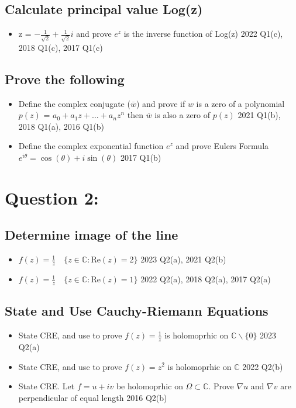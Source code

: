\documentclass[a4paper, 8pt]{extarticle}
\begin{document}
\subsection{Calculate principal value Log(z)}
\begin{itemize}
    \item z = $-\frac{1}{\sqrt{2}} + \frac{1}{\sqrt{2}} i$ and prove $e^z$ is the inverse function of Log(z) \hfill 2022 Q1(c), 2018 Q1(c), 2017 Q1(c)
\end{itemize}
\subsection{Prove the following}
\begin{itemize}
    \item Define the complex conjugate ($\overline{w}$) and prove if $w$ is a zero of a polynomial $p(z)$ = $a_0 + a_1 z + \ldots + a_n z^n$ then $\overline{w}$ is also a zero of $p(z)$ \hfill 2021 Q1(b), 2018 Q1(a), 2016 Q1(b)
    \item Define the complex exponential function $e^z$ and prove Eulers Formula $e^{i \theta} = \cos(\theta) + i \sin(\theta)$ \hfill 2017 Q1(b)
\end{itemize}





\pagebreak


\section{Question 2: }
\subsection{Determine image of the line}
\begin{itemize}
    \item $f(z) = \frac{1}{z} \quad \{z \in \mathbb{C}: \text{Re}(z) = 2\}$ \hfill 2023 Q2(a), 2021 Q2(b)
    \item $f(z) = \frac{1}{z} \quad \{z \in \mathbb{C}: \text{Re}(z) = 1\}$ \hfill 2022 Q2(a), 2018 Q2(a), 2017 Q2(a)
\end{itemize}
\subsection{State and Use Cauchy-Riemann Equations}
\begin{itemize}
    \item State CRE, and use to prove $f(z) = \frac{1}{z}$ is holomoprhic on $\mathbb{C} \backslash \{0\}$ \hfill 2023 Q2(a)
    \item State CRE, and use to prove $f(z) = z^2$ is holomoprhic on $\mathbb{C}$ \hfill 2022 Q2(b)
    \item State CRE. Let $f = u+iv$ be holomoprhic on $\Omega \subset \mathbb{C}$. Prove $\nabla u$ and $\nabla v$ are perpendicular of equal length \hfill 2016 Q2(b)
\end{itemize}
\end{document}
